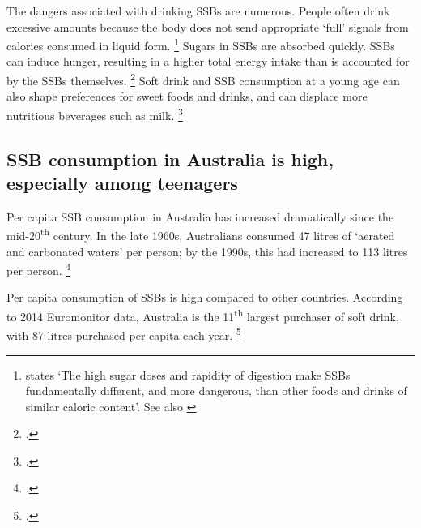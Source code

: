 \documentclass[embargoed]{grattan}
\begin{document}
The dangers associated with drinking SSBs are numerous.
People often drink excessive amounts because the body does not send appropriate `full' signals from calories consumed in liquid form.%
\footnote{\textcite{Mozaffarian2016politicssciencesoda} states `The high sugar doses and rapidity of digestion make SSBs fundamentally different, and more dangerous, than other foods and drinks of similar caloric content'.
See also \textcites{Fletcher2011Aresoftdrink}{Malik2006Intakesugarsweetened}{Ruyter2012trialsugarfree}{Johnson2009Dietarysugarsintake}{Gill2006weightevidencesuggests}{Panel2014POLICYBRIEFoptions}{Malik2010Sugarsweetenedbeverages}{Popkin2012Sugarybeveragesrepresent}{PublicHealth2016SugaryDrinks}{Health2013AustralianDietaryGuidelines}} Sugars in SSBs are absorbed quickly.
SSBs can induce hunger, resulting in a higher total energy intake than is accounted for by the SSBs themselves.%
\footcites{Vartanian2007Effectssoftdrink}{St-Onge2004Addedthermogenicsatiety} Soft drink and SSB consumption at a young age can also shape preferences for sweet foods and drinks, and can displace more nutritious beverages such as milk.%
\footcites{Popkin2012Sugarybeveragesrepresent}{Malik2006Intakesugarsweetened}{Vartanian2007Effectssoftdrink}

\subsection{SSB consumption in Australia is high, especially among teenagers}\label{ssb-consumption-in-australia-is-high-especially-among-teenagers}

Per capita SSB consumption in Australia has increased dramatically since the mid-20\textsuperscript{th} century.
In the late 1960s, Australians consumed 47 litres of `aerated and carbonated waters' per person; by the 1990s, this had increased to 113 litres per person.%
\footcite{ABS200043060Apparentconsumption}

Per capita consumption of SSBs is high compared to other countries.
According to 2014 Euromonitor data, Australia is the 11\textsuperscript{th} largest purchaser of soft drink, with 87 litres purchased per capita each year.%
\footcites{Silver2015IdBuyEmerging}{Popkin2016Sweeteningglobaldiet}
\end{document}
